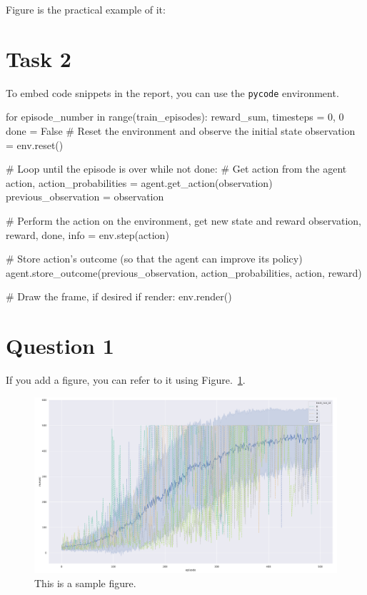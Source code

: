 \documentclass[12pt]{article}
\begin{document}
Figure is the practical example of it:

\section{Task 2}
To embed code snippets in the report, you can use the \texttt{pycode} environment.

\begin{pycode}
for episode_number in range(train_episodes):
    reward_sum, timesteps = 0, 0
    done = False
    # Reset the environment and observe the initial state
    observation = env.reset()

    # Loop until the episode is over
    while not done:
        # Get action from the agent
        action, action_probabilities = agent.get_action(observation)
        previous_observation = observation

        # Perform the action on the environment, get new state and reward
        observation, reward, done, info = env.step(action)

        # Store action's outcome (so that the agent can improve its policy)
        agent.store_outcome(previous_observation, action_probabilities, action, reward)

        # Draw the frame, if desired
        if render:
            env.render()
\end{pycode}

\section{Question 1}

If you add a figure, you can refer to it using Figure.~\ref*{fig:fig1}.

\begin{figure}[h] 
	\centering  %
    \includegraphics[width=0.9\columnwidth]{img/training.pdf}
	\caption{This is a sample figure.}
	\label{fig:fig1}
\end{figure}


\end{document}
